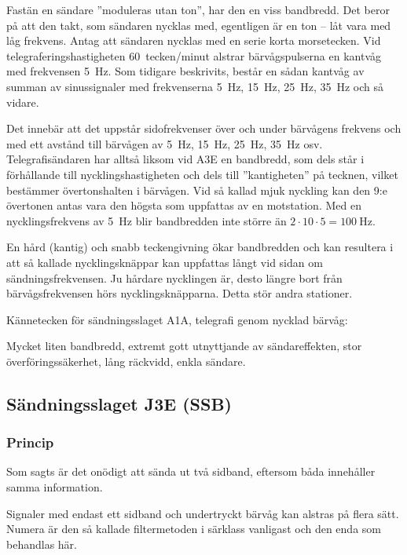 Fastän en sändare ''moduleras utan ton'', har den en viss bandbredd.
Det beror på att den takt, som sändaren nycklas med, egentligen är en ton --
låt vara med låg frekvens.
Antag att sändaren nycklas med en serie korta morsetecken.
Vid telegraferingshastigheten 60~tecken/minut alstrar bärvågspulserna en kantvåg
med frekvensen \qty{5}{\hertz}.
Som tidigare beskrivits, består en sådan kantvåg av summan av sinussignaler med
frekvenserna \qty{5}{\hertz}, \qty{15}{\hertz}, \qty{25}{\hertz},
\qty{35}{\hertz} och så vidare.

Det innebär att det uppstår sidofrekvenser över och under bärvågens frekvens och
med ett avstånd till bärvågen av \qty{5}{\hertz}, \qty{15}{\hertz},
\qty{25}{\hertz}, \qty{35}{\hertz} osv.
Telegrafisändaren har alltså liksom vid A3E en bandbredd, som dels står i
förhållande till nycklingshastigheten och dels till ''kantigheten'' på tecknen,
vilket bestämmer övertonshalten i bärvågen.
Vid så kallad mjuk nyckling kan den 9:e övertonen antas vara den högsta som
uppfattas av en motstation.
Med en nycklingsfrekvens av \qty{5}{\hertz} blir bandbredden inte större än
\(2 \cdot 10 \cdot 5 = \qty{100}{\hertz}\).

En hård (kantig) och snabb teckengivning ökar bandbredden och kan resultera i
att så kallade nycklingsknäppar kan uppfattas långt vid sidan om
sändningsfrekvensen.
Ju hårdare nycklingen är, desto längre bort från bärvågsfrekvensen hörs
nycklingsknäpparna.
Detta stör andra stationer.

Kännetecken för sändningsslaget A1A, telegrafi genom nycklad bärvåg:

Mycket liten bandbredd, extremt gott utnyttjande av sändareffekten, stor
överföringssäkerhet, lång räckvidd, enkla sändare.

\subsection{Sändningsslaget J3E (SSB)}
\label{modulation_ssb}

\subsubsection{Princip}

Som sagts är det onödigt att sända ut två sidband, eftersom båda innehåller
samma information.

Signaler med endast ett sidband och undertryckt bärvåg kan alstras på flera
sätt.
Numera är den så kallade filtermetoden i särklass vanligast och den enda som
behandlas här.

